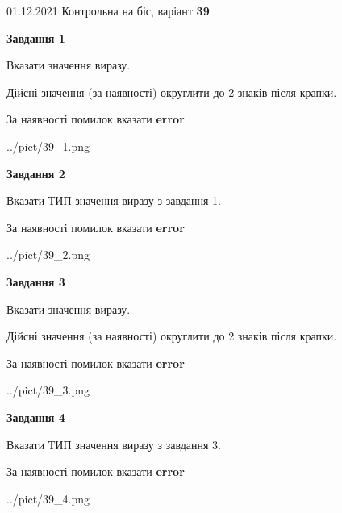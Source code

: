 \documentclass[11pt, ukrainian]{article}
\begin{document}
{01.12.2021 Контрольна на біс, варіант  \No \textbf { 39 }\par}
{
\begin {large}
{\begin {center}\textbf{Завдання 1}\end {center}}\par
Вказати значення виразу. \par
Дійсні значення (за наявності) округлити до 2 знаків після крапки. \par
За наявності помилок вказати \textbf{error}

\begin{center}
	{../pict/39_1.png}
\end{center}
\newpage

{\begin {center}\textbf{Завдання 2}\end {center}}\par
Вказати ТИП значення виразу з завдання 1. \par
За наявності помилок вказати \textbf{error}

\begin{center}
	{../pict/39_2.png}
\end{center}
\newpage

{\begin {center}\textbf{Завдання 3}\end {center}}\par
Вказати значення виразу. \par
Дійсні значення (за наявності) округлити до 2 знаків після крапки. \par
За наявності помилок вказати \textbf{error}

\begin{center}
	{../pict/39_3.png}
\end{center}
\newpage

{\begin {center}\textbf{Завдання 4}\end {center}}\par
Вказати ТИП значення виразу з завдання 3. \par
За наявності помилок вказати \textbf{error}

\begin{center}
	{../pict/39_4.png}
\end{center}
\newpage


\end{large}}
\end{document}
